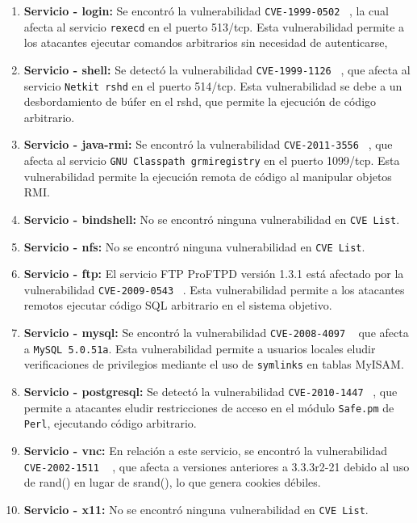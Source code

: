 \documentclass[a4paper,12pt]{article} %
\begin{document}
\begin{enumerate}
        \item \textbf{Servicio - login: } Se encontró la vulnerabilidad \texttt{CVE-1999-0502} ~\cite{cve16}, la cual afecta al servicio \texttt{rexecd} en el puerto 513/tcp. Esta vulnerabilidad permite a los atacantes ejecutar comandos arbitrarios sin necesidad de autenticarse,
        \item \textbf{Servicio - shell: } Se detectó la vulnerabilidad \texttt{CVE-1999-1126} ~\cite{cve17}, que afecta al servicio \texttt{Netkit rshd} en el puerto 514/tcp. Esta vulnerabilidad se debe a un desbordamiento de búfer en el rshd, que permite la ejecución de código arbitrario. 
        \item \textbf{Servicio - java-rmi: } Se encontró la vulnerabilidad \texttt{CVE-2011-3556} ~\cite{cve18}, que afecta al servicio \texttt{GNU Classpath grmiregistry} en el puerto 1099/tcp. Esta vulnerabilidad permite la ejecución remota de código al manipular objetos RMI.
        \item \textbf{Servicio - bindshell: } No se encontró ninguna vulnerabilidad en \texttt{CVE List}.
        \item \textbf{Servicio - nfs: } No se encontró ninguna vulnerabilidad en \texttt{CVE List}.
        \item \textbf{Servicio - ftp: }El servicio FTP ProFTPD versión 1.3.1 está afectado por la vulnerabilidad \texttt{CVE-2009-0543} ~\cite{cve19}. Esta vulnerabilidad permite a los atacantes remotos ejecutar código SQL arbitrario en el sistema objetivo.
        \item \textbf{Servicio - mysql: } Se encontró la vulnerabilidad \texttt{CVE-2008-4097} ~\cite{cve20} que afecta a \texttt{MySQL 5.0.51a}. Esta vulnerabilidad permite a usuarios locales eludir verificaciones de privilegios mediante el uso de \texttt{symlinks} en tablas MyISAM.
        \item \textbf{Servicio - postgresql: } Se detectó la vulnerabilidad \texttt{CVE-2010-1447} ~\cite{cve21}, que permite a atacantes eludir restricciones de acceso en el módulo \texttt{Safe.pm} de \texttt{Perl}, ejecutando código arbitrario. 
        \item \textbf{Servicio - vnc: } En relación a este servicio, se encontró la vulnerabilidad \texttt{CVE-2002-1511} ~\cite{cve22} , que afecta a versiones anteriores a 3.3.3r2-21 debido al uso de rand() en lugar de srand(), lo que genera cookies débiles.
        \item \textbf{Servicio - x11: } No se encontró ninguna vulnerabilidad en \texttt{CVE List}.

\end{enumerate}
\end{document}

